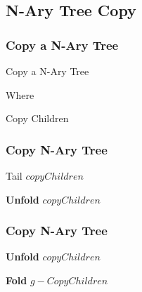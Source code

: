 \documentclass{beamer}
\begin{document}
\subsection{N-Ary Tree Copy}
\begin{frame}
	\frametitle{Copy a N-Ary Tree}
	\begin{block}{Copy a N-Ary Tree}
		\begin{algorithmic}[1]
				\State {}
			\EndProcedure
		\end{algorithmic}
	\end{block}
	Where
	\begin{block}{Copy Children}
		\begin{algorithmic}[1]
					\State \Return{$[]$}
				\Else
					\State {}
				\EndIf
			\EndProcedure
		\end{algorithmic}
	\end{block}

\end{frame}
\begin{frame}
	\frametitle{Copy N-Ary Tree}
	\begin{block}{Tail $copyChildren$}
		\begin{algorithmic}[1]
				\State {}
			\EndProcedure
		\end{algorithmic}
	\end{block}
	\begin{block}{\textbf{Unfold} $copyChildren$}
		\begin{algorithmic}[1]
					\State {}
				\Else
					\State {}
				\EndIf
			\EndProcedure
		\end{algorithmic}
	\end{block}
\end{frame}
\begin{frame}
	\frametitle{Copy N-Ary Tree}
	\begin{block}{\textbf{Unfold} $copyChildren$}
		\small
		\begin{algorithmic}[1]
					\State {}
				\Else
					\State {}
				\EndIf
			\EndProcedure
		\end{algorithmic}
	\end{block}
	\begin{block}{\textbf{Fold} $g-CopyChildren$}
		\small
		\begin{algorithmic}[1]
					\State {}
				\Else
					\State {} 
				\EndIf
			\EndProcedure
		\end{algorithmic}
	\end{block}
\end{frame}
\end{document}

